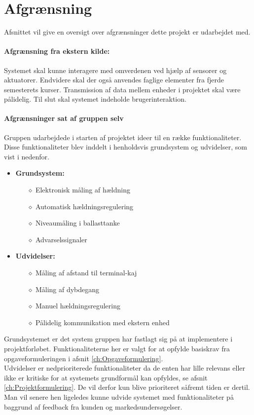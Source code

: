 \chapter{Afgrænsning}
\label{ch:afgraensning}
Afsnittet vil give en oversigt over afgrænsninger dette projekt er udarbejdet med.
\subsubsection{Afgrænsning fra ekstern kilde:}
Systemet skal kunne interagere med omverdenen ved hjælp af sensorer og aktuatorer. Endvidere skal der også anvendes faglige elementer fra fjerde semesterets kurser. Transmission af data mellem enheder i projektet skal være pålidelig. Til slut skal systemet indeholde brugerinteraktion. 
\subsubsection{Afgrænsninger sat af gruppen selv}
Gruppen udarbejdede i starten af projektet ideer til en række funktionaliteter. Disse funktionaliteter blev inddelt i henholdsvis grundsystem og udvidelser, som vist i nedenfor.
\begin{itemize}
\item \textbf{Grundsystem:}
\begin{itemize}
\item[$\diamond$] Elektronisk måling af hældning
\item[$\diamond$] Automatisk hældningsregulering
\item[$\diamond$] Niveaumåling i ballasttanke
\item[$\diamond$] Advarselssignaler
\end{itemize}
\item \textbf{Udvidelser:}
\begin{itemize}
\item[$\diamond$] Måling af afstand til terminal-kaj
\item[$\diamond$] Måling af dybdegang
\item[$\diamond$] Manuel hældningsregulering
\item[$\diamond$] Pålidelig kommunikation med ekstern enhed
\end{itemize}
\end{itemize}

Grundsystemet er det system gruppen har fastlagt sig på at implementere i projektforløbet. Funktionaliteterne her er valgt for at opfylde basiskrav fra opgaveformuleringen i afsnit \ref{ch:Opgaveformulering}.\\
Udvidelser er nedprioriterede funktionaliteter da de enten har lille relevans eller ikke er kritiske for at systemets grundformål kan opfyldes, se afsnit \ref{ch:Projektformulering}. De vil derfor kun blive prioriteret såfremt tiden er dertil. \\

Man vil senere hen ligeledes kunne udvide systemet med funktionaliteter på baggrund af feedback fra kunden og markedsundersøgelser.

